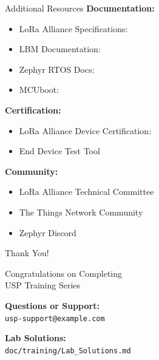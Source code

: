\documentclass{beamer}
\begin{document}
\begin{frame}{Additional Resources}
\textbf{Documentation:}
\begin{itemize}
    \item LoRa Alliance Specifications: 
    \item LBM Documentation: 
    \item Zephyr RTOS Docs: 
    \item MCUboot: 
\end{itemize}

\vspace{0.3cm}

\textbf{Certification:}
\begin{itemize}
    \item LoRa Alliance Device Certification: 
    \item End Device Test Tool
\end{itemize}

\vspace{0.3cm}

\textbf{Community:}
\begin{itemize}
    \item LoRa Alliance Technical Committee
    \item The Things Network Community
    \item Zephyr Discord
\end{itemize}
\end{frame}

\begin{frame}[plain]
\begin{center}
\Huge Thank You!

\vspace{1cm}

\Large Congratulations on Completing\\USP Training Series

\vspace{1cm}

\normalsize
\textbf{Questions or Support:}\\
\texttt{usp-support@example.com}

\vspace{0.5cm}

\textbf{Lab Solutions:}\\
\texttt{doc/training/Lab\_Solutions.md}
\end{center}
\end{frame}
\end{document}
